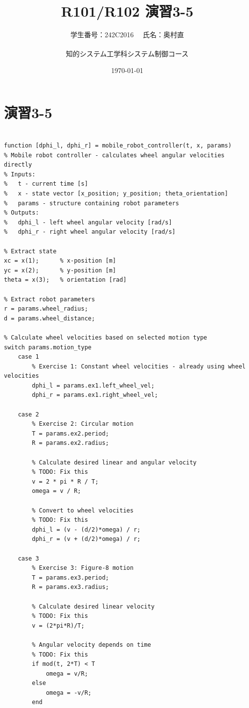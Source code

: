 \documentclass[10pt,a4paper,titlepage]{jreport} %
\title{R101/R102 演習3-5} %
\author{
  学生番号：242C2016 　氏名：奥村直 \\
  \\
  知的システム工学科システム制御コース
  } %
\date{\today} %
\begin{document}
\maketitle

\chapter{演習3-5}

\begin{lstlisting}[caption=modified＿mobile＿robot＿controller.m]

function [dphi_l, dphi_r] = mobile_robot_controller(t, x, params)
% Mobile robot controller - calculates wheel angular velocities directly
% Inputs:
%   t - current time [s]
%   x - state vector [x_position; y_position; theta_orientation]
%   params - structure containing robot parameters
% Outputs:
%   dphi_l - left wheel angular velocity [rad/s]
%   dphi_r - right wheel angular velocity [rad/s]

% Extract state
xc = x(1);      % x-position [m]
yc = x(2);      % y-position [m]
theta = x(3);   % orientation [rad]

% Extract robot parameters
r = params.wheel_radius;
d = params.wheel_distance;

% Calculate wheel velocities based on selected motion type
switch params.motion_type
    case 1
        % Exercise 1: Constant wheel velocities - already using wheel velocities
        dphi_l = params.ex1.left_wheel_vel;
        dphi_r = params.ex1.right_wheel_vel;
        
    case 2
        % Exercise 2: Circular motion
        T = params.ex2.period;
        R = params.ex2.radius;
        
        % Calculate desired linear and angular velocity
        % TODO: Fix this
        v = 2 * pi * R / T;
        omega = v / R;
        
        % Convert to wheel velocities
        % TODO: Fix this
        dphi_l = (v - (d/2)*omega) / r;
        dphi_r = (v + (d/2)*omega) / r;
        
    case 3
        % Exercise 3: Figure-8 motion
        T = params.ex3.period;
        R = params.ex3.radius;
        
        % Calculate desired linear velocity
        % TODO: Fix this
        v = (2*pi*R)/T;
        
        % Angular velocity depends on time
        % TODO: Fix this
        if mod(t, 2*T) < T
            omega = v/R;
        else
            omega = -v/R;
        end
        

\end{lstlisting}
\end{document}
